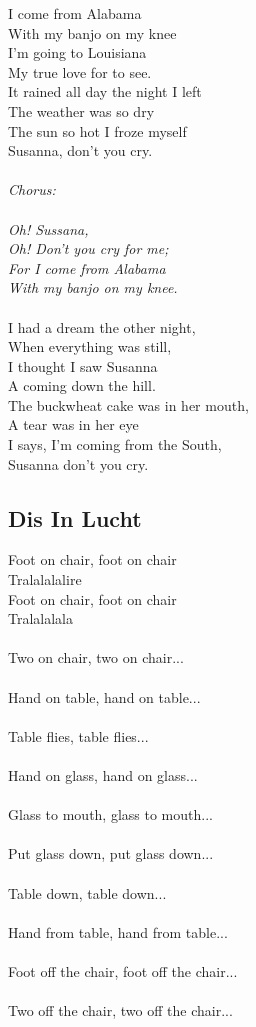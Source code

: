 \documentclass[a5paper]{article}
\begin{document}
I come from Alabama\\
With my banjo on my knee\\
I'm going to Louisiana\\
My true love for to see.\\
It rained all day the night I left\\
The weather was so dry\\
The sun so hot I froze myself\\
Susanna, don't you cry.\\
\\
\textit{Chorus:\\
\\
Oh! Sussana,\\
Oh! Don't you cry for me;\\
For I come from Alabama\\
With my banjo on my knee.\\}
\\
I had a dream the other night,\\
When everything was still,\\
I thought I saw Susanna\\
A coming down the hill.\\
The buckwheat cake was in her mouth,\\
A tear was in her eye\\
I says, I'm coming from the South,\\
Susanna don't you cry.\\

\newpage

\subsection{Dis In Lucht} %
\label{sub:dis_in_lucht}


Foot on chair, foot on chair \\
Tralalalalire\\
Foot on chair, foot on chair \\
Tralalalala\\
\\
Two on chair, two on chair...\\
\\
Hand on table, hand on table... \\
\\
Table flies, table flies...\\
\\
Hand on glass, hand on glass...\\
\\
Glass to mouth, glass to mouth...\\
\\
Put glass down, put glass down...\\
\\
Table down, table down...\\
\\
Hand from table, hand from table...\\
\\
Foot off the chair, foot off the chair...\\
\\
Two off the chair, two off the chair...
\end{document}
